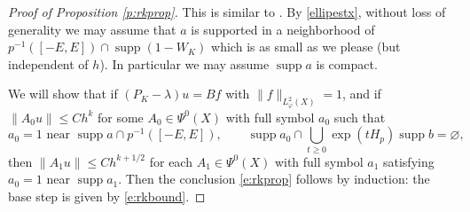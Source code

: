 \documentclass[reqno, 12pt]{amsart}
\DeclareMathOperator \supp {supp}
\theoremstyle{definition}
\numberwithin{equation}{section}
\numberwithin{prop}{section}
\numberwithin{figure}{section}
\begin{document}
\begin{proof}[Proof of Proposition \ref{p:rkprop}]
This is similar to \cite[Lemma 5.1]{Datchev-Vasy:Gluing}. By  \eqref{ellipestx}, without loss of generality we may assume that $a$ is supported in a neighborhood of $p^{-1}([-E,E]) \cap \supp (1-W_K)$ which is as small as we please (but independent of $h$). In particular we may assume $\supp a$ is compact.

We will show that if $(P_K - \lambda)u = B f$ with $\|f\|_{L^2_\varphi(X)} = 1$, and if $\|A_0u\| \le C h^k$ for some $A_0 \in \Psi^0(X)$ with full symbol $a_0$ such that
\[
a_0 = 1 \textrm{ near } \supp a \cap p^{-1}([-E,E]),\qquad \supp a_0 \cap \bigcup_{t \ge 0} \exp(tH_p)\supp b = \varnothing,
\] 
then $\|A_1 u\| \le C h^{k+1/2}$ for each $A_1 \in \Psi^0(X)$ with full symbol $a_1$ satisfying $a_0 = 1$ near $\supp a_1$. Then the conclusion \eqref{e:rkprop} follows by induction: the base step is given by \eqref{e:rkbound}.


\end{proof}
\end{document}
